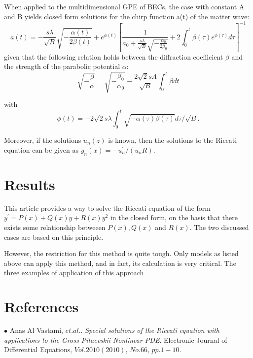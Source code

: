 \documentclass{article}
\begin{document}
\begin{enumerate}
When applied to the multidimensional GPE of BECs, the case with constant A
and B yields closed form solutions for the chirp function a(t) of the matter wave:
\begin{equation}
a ( t ) = - \frac { s \lambda } { \sqrt { B } } \sqrt { - \frac { \alpha ( t ) } { 2 \beta ( t ) } } + e ^ { \phi ( t ) } \left[ \frac { 1 } { a _ { 0 } + \frac { s \lambda } { \sqrt { B } } \sqrt { - \frac { \alpha _ { 0 } } { 2 \beta _ { 0 } } } } + 2 \int _ { 0 } ^ { t } \beta ( \tau ) e ^ { \phi ( \tau ) } d \tau \right] ^ { - 1 }
\end{equation}
given that the following relation holds between the diffraction coefficient $\beta$ and the strength of the parabolic potential $\alpha$:
\begin{equation}
\sqrt { - \frac { \beta } { \alpha } } = \sqrt { - \frac { \beta _ { 0 } } { \alpha _ { 0 } } } - \frac { 2 \sqrt { 2 } s A } { \sqrt { B } } \int _ { 0 } ^ { t } \beta d t
\end{equation}

with 
\begin{equation}
\phi ( t ) = - 2 \sqrt { 2 } s \lambda \int _ { 0 } ^ { t } \sqrt { - \alpha ( \tau ) \beta ( \tau ) } d \tau / \sqrt { B }.
\end{equation}




Moreover, if the solutions $u_n(z)$ is known, then the solutions to the Riccati equation can be given as $y _ { n } ( x ) = - u _ { n } ^ { \prime } / \left( u _ { n } R \right)$. 



\end{enumerate}






\section{Results}
This article provides a way to solve the Riccati equation of the form $y ^ { \prime } = P ( x ) + Q ( x ) y + R ( x ) y ^ { 2 }$ in the closed form, on the basis that there exists some relationship betweeen $P(x), Q(x)$ and $R(x)$. The two discussed cases are based on this principle.  


However, the restriction for this method is quite tough. Only models as listed above can apply this method, and in fact, its calculation is very critical. The three examples of application of this approach 


\section{References}
$\bullet$ Anas Al Vastami, $et.al.$. \textit{Special solutions of the Riccati equation with applications to the Gross-Pitaevskii Nonlinear PDE}. Electronic Journal of Differential Equations, $Vol. 2010(2010)$, $No. 66$, $pp. 1-10$.
\end{document}
